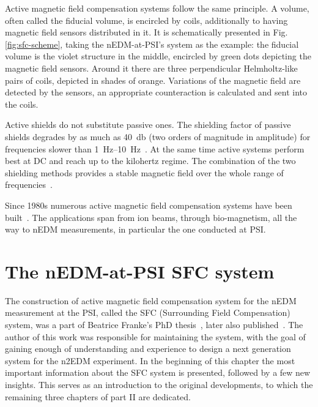 Active magnetic field compensation systems follow the same principle. A volume, often called the fiducial volume, is encircled by coils, additionally to having magnetic field sensors distributed in it. It is schematically presented in Fig.\,\ref{fig:sfc-scheme}, taking the nEDM-at-PSI's system as the example: the fiducial volume is the violet structure in the middle, encircled by green dots depicting the magnetic field sensors. Around it there are three perpendicular Helmholtz-like pairs of coils, depicted in shades of orange. Variations of the magnetic field are detected by the sensors, an appropriate counteraction is calculated and sent into the coils.

Active shields do not substitute passive ones. The shielding factor
 of passive shields degrades by as much as \SI{40}{\decibel} (two orders of magnitude in amplitude) for frequencies slower than \SIrange[range-phrase = --]{1}{10}{\hertz}~\cite{Brake1991}. At the same time active systems perform best at DC and reach up to the kilohertz regime. The combination of the two shielding methods provides a stable magnetic field over the whole range of frequencies~\cite{Brake1991,Kelha1982,Voigt2013}.

Since 1980s numerous active magnetic field compensation systems have been built~\cite{Kelha1982,Brake1991,Spemann2003,Brys2005,Kobayashi2012,Voigt2013,Afach2014}. The applications span from ion beams, through bio-magnetism, all the way to nEDM measurements, in particular the one conducted at PSI\@.




\section{The nEDM-at-PSI SFC system}
The construction of active magnetic field compensation system for the nEDM measurement at the PSI, called the SFC (Surrounding Field Compensation) system,
was a part of Beatrice Franke's PhD thesis~\cite{Franke2013}, later also published~\cite{Afach2014}. The author of this work was responsible for maintaining the system, with the goal of gaining enough of understanding and experience to design a next generation system for the n2EDM experiment. In the beginning of this chapter the most important information about the SFC system is presented, followed by a few new insights. This serves as an introduction to the original developments, to which the remaining three chapters of part II are dedicated.

